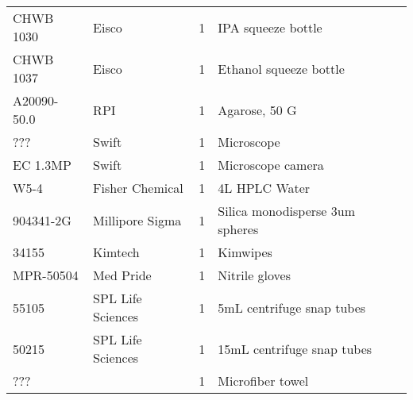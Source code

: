\begin{tabular}{ l l l l l }
    CHWB 1030 & Eisco & 1 & IPA squeeze bottle \\

    CHWB 1037 & Eisco & 1 & Ethanol squeeze bottle \\

    A20090-50.0 & RPI & 1 & Agarose, 50 G \\

    ??? & Swift & 1 & Microscope \\

    EC 1.3MP & Swift & 1 & Microscope camera \\

    W5-4 & Fisher Chemical & 1 & 4L HPLC Water \\

    904341-2G & Millipore Sigma & 1 & Silica monodisperse 3um spheres \\

    34155 & Kimtech & 1 & Kimwipes \\

    MPR-50504 & Med Pride & 1 & Nitrile gloves \\

    55105 & SPL Life Sciences & 1 & 5mL centrifuge snap tubes \\

    50215 & SPL Life Sciences & 1 & 15mL centrifuge snap tubes \\

    ??? & & 1 & Microfiber towel \\
    \bottomrule[2pt]
\end{tabular}

